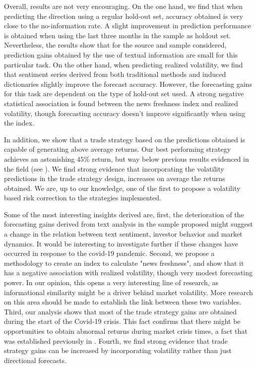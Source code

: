 \documentclass[a4paper, 12pt]{report}
\begin{document}
    Overall, results are not very encouraging. On the one hand, we find that when predicting the direction using a regular hold-out set, accuracy obtained is very close to the no-information rate. A slight improvement in prediction performance is obtained when using the last three months in the sample as holdout set. Nevertheless, the results show that for the source and sample considered, prediction gains obtained by the use of textual information are small for this particular task. On the other hand, when predicting realized volatility, we find that sentiment series derived from both traditional methods and induced dictionaries slightly improve the forecast accuracy. However, the forecasting gains for this task are dependent on the type of hold-out set used. A strong negative statistical association is found between the news freshness index and realized volatility, though forecasting accuracy doesn't improve significantly when using the index. 
    
   In addition, we show that a trade strategy based on the predictions obtained is capable of generating above average returns. Our best performing strategy achieves an astonishing $45\%$ return, but way below previous results evidenced in the field (see \textcite{Engelberg:2012}). We find strong evidence that incorporating the volatility predictions in the trade strategy design, increases on average the returns obtained. We are, up to our knowledge, one of the first to propose a volatility based risk correction to the strategies implemented. 
    
    Some of the most interesting insights derived are, first, the deterioration of the forecasting gains derived from text analysis in the sample proposed might suggest a change in the relation between text sentiment, investor behavior and market dynamics. It would be interesting to investigate further if these changes have occurred in response to the covid-19 pandemic. Second, we propose a methodology to create an index to calculate "news freshness", and show that it has a negative association with realized volatility, though very modest forecasting power. In our opinion, this opens a very interesting line of research, as informational similarity might be a driver behind market volatility. More research on this area should be made to establish the link between these two variables. Third, our analysis shows that most of the trade strategy gains are obtained during the start of the Covid-19 crisis. This fact confirms that there might be opportunities to obtain abnormal returns during market crisis times, a fact that was established previously in \textcite{Garcia:2013}. Fourth, we find strong evidence that trade strategy gains can be increased by incorporating volatility rather than just directional forecasts. 
    
\end{document}
